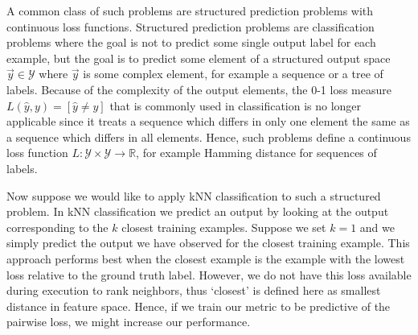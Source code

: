 A common class of such problems are structured prediction problems with continuous loss functions. Structured prediction problems are classification problems where the goal is not to predict some single output label for each example, but the goal is to predict some element of a structured output space $\vec{y} \in \mathcal{Y}$ where $\vec{y}$ is some complex element, for example a sequence or a tree of labels. Because of the complexity of the output elements, the 0-1 loss measure $L(\hat{y}, y) = \left[\hat{y} \ne y\right]$ that is commonly used in classification is no longer applicable since it treats a sequence which differs in only one element the same as a sequence which differs in all elements. Hence, such problems define a continuous loss function $L: \mathcal{Y} \times \mathcal{Y} \rightarrow \mathbb{R}$, for example Hamming distance for sequences of labels.

Now suppose we would like to apply \acf{kNN} classification to such a structured problem. In \ac{kNN} classification we predict an output by looking at the output corresponding to the $k$ closest training examples. Suppose we set $k = 1$ and we simply predict the output we have observed for the closest training example. This approach performs best when the closest example is the example with the lowest loss relative to the ground truth label. However, we do not have this loss available during execution to rank neighbors, thus `closest' is defined here as smallest distance in feature space. Hence, if we train our metric to be predictive of the pairwise loss, we might increase our performance.